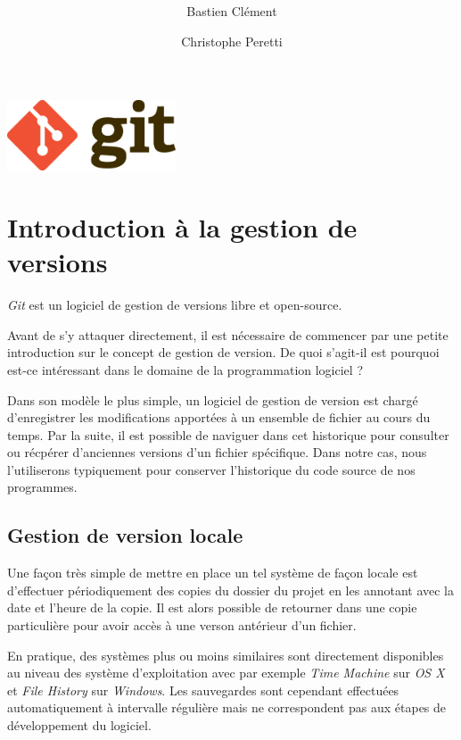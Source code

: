 \documentclass[11pt,a4paper]{article}
\author{Bastien Clément \and Christophe Peretti}
\title{{\normalsize \doccourse} \\ \doctitle }
\begin{document}
\maketitle

\vspace{4cm}
\begin{center}
\includegraphics[width=5cm]{git_logo}
\end{center}

\pagebreak

\tableofcontents

\pagebreak

\section{Introduction à la gestion de versions}

\textit{Git} est un logiciel de gestion de versions libre et open-source.

Avant de s'y attaquer directement, il est nécessaire de commencer par une petite introduction sur le concept de gestion de version. De quoi s'agit-il est pourquoi est-ce intéressant dans le domaine de la programmation logiciel ?

Dans son modèle le plus simple, un logiciel de gestion de version est chargé d'enregistrer les modifications apportées à un ensemble de fichier au cours du temps. Par la suite, il est possible de naviguer dans cet historique pour consulter ou récpérer d'anciennes versions d'un fichier spécifique. Dans notre cas, nous l'utiliserons typiquement pour conserver l'historique du code source de nos programmes.

\subsection{Gestion de version locale}

Une façon très simple de mettre en place un tel système de façon locale est d'effectuer périodiquement des copies du dossier du projet en les annotant avec la date et l'heure de la copie. Il est alors possible de retourner dans une copie particulière pour avoir accès à une verson antérieur d'un fichier.

En pratique, des systèmes plus ou moins similaires sont directement disponibles au niveau des système d'exploitation avec par exemple \textit{Time Machine} sur \textit{OS X} et \textit{File History} sur \textit{Windows}. Les sauvegardes sont cependant effectuées automatiquement à intervalle régulière mais ne correspondent pas aux étapes de développement du logiciel.
\end{document}

